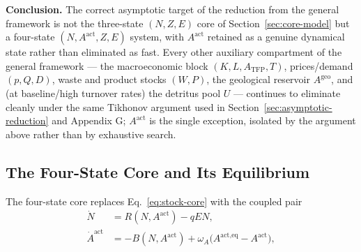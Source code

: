 \documentclass[twocolumn,10pt]{article}
\begin{document}
\textbf{Conclusion.} The correct asymptotic target of the reduction from the general framework is not the three-state $(N,Z,E)$ core of Section~\ref{sec:core-model} but a four-state $(N,A^{\text{act}},Z,E)$ system, with $A^{\text{act}}$ retained as a genuine dynamical state rather than eliminated as fast. Every other auxiliary compartment of the general framework --- the macroeconomic block $(K,L,A_{\text{TFP}},T)$, prices/demand $(p,Q,D)$, waste and product stocks $(W,P)$, the geological reservoir $A^{\text{geo}}$, and (at baseline/high turnover rates) the detritus pool $U$ --- continues to eliminate cleanly under the same Tikhonov argument used in Section~\ref{sec:asymptotic-reduction} and Appendix G; $A^{\text{act}}$ is the single exception, isolated by the argument above rather than by exhaustive search.

\subsection{The Four-State Core and Its Equilibrium}
\label{sec:four-state-model}
The four-state core replaces Eq.~\eqref{eq:stock-core} with the coupled pair
\begin{align}
\dot N &= R(N,A^{\text{act}}) - qEN, \label{eq:fourstate-N}\\
\dot A^{\text{act}} &= -B(N,A^{\text{act}}) + \omega_A\bigl(A^{\text{act,eq}}-A^{\text{act}}\bigr), \label{eq:fourstate-A}
\end{align}
\end{document}
